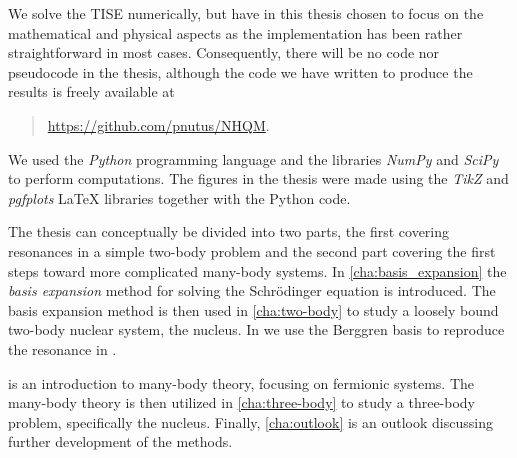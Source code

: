 \documentclass[../main/report.tex]{subfiles}
\begin{document}
We solve the TISE numerically, but have in this thesis chosen to focus on the mathematical and physical aspects as the implementation has been rather straightforward in most cases.
Consequently, there will be no code nor pseudocode in the thesis, although the code we have written to produce the results is freely available at
\begin{quote}
  \url{https://github.com/pnutus/NHQM}.
\end{quote}
We used the \emph{Python} programming language and the libraries \emph{NumPy} and \emph{SciPy} to perform computations. 
The figures in the thesis were made using the \emph{TikZ} and \emph{pgfplots} LaTeX libraries together with the Python code.

The thesis can conceptually be divided into two parts, the first covering resonances in a simple two-body problem and the second part covering the first steps toward more complicated many-body systems. 
In \cref{cha:basis_expansion} the \emph{basis expansion} method for solving the Schrödinger equation is introduced.
The basis expansion method is then used in \cref{cha:two-body} to study a loosely bound two-body nuclear system, the  nucleus.
In  we use the Berggren basis to reproduce the resonance in .

 is an introduction to many-body theory, focusing on fermionic systems. 
The many-body theory is then utilized in \cref{cha:three-body} 
to study a three-body problem, specifically the  nucleus.  
Finally, \cref{cha:outlook} is an outlook discussing further development of the methods.
\end{document}
